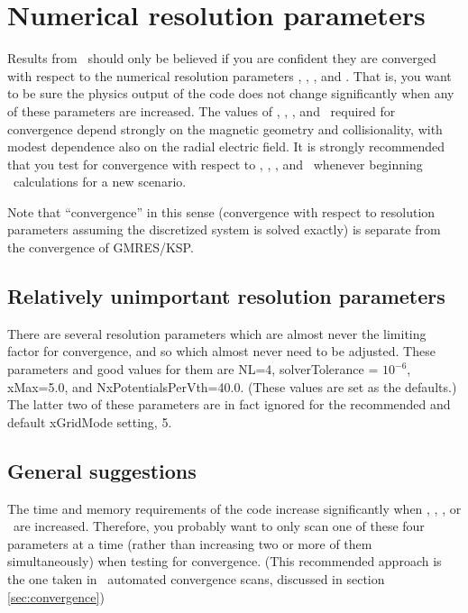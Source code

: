 \chapter{Numerical resolution parameters}
\label{ch:resolution}

Results from \sfincs~should only be believed if you are confident they
are converged with respect to the numerical resolution parameters
\Ntheta, \Nzeta, \Nxi, and \Nx.  That is, you want to be sure the
physics output of the code does not change significantly when any of
these parameters are increased. The values of \Ntheta, \Nzeta, \Nxi,
and \Nx~required for convergence depend strongly on the magnetic
geometry and collisionality, with modest dependence also on the radial
electric field. It is strongly recommended that you test for
convergence with respect to \Ntheta, \Nzeta, \Nxi, and \Nx~whenever
beginning \sfincs~calculations for a new scenario.

Note that ``convergence'' in this sense (convergence with respect to resolution parameters assuming the discretized
system is solved exactly) is separate from the convergence of GMRES/KSP.

\section{Relatively unimportant resolution parameters}

There are several resolution parameters which are almost never the limiting factor
for convergence, and so which almost never need to be adjusted.
These parameters and good values for them are {\ttfamily NL=4}, 
{\ttfamily solverTolerance} = $10^{-6}$,
{\ttfamily xMax=5.0},
and {\ttfamily NxPotentialsPerVth=40.0}.  
(These values are set as the defaults.)
The latter two of these parameters are in fact ignored
for the recommended and default {\ttfamily xGridMode} setting, 5.

\section{General suggestions}

The time and memory requirements of the code increase significantly
when \Ntheta, \Nzeta, \Nxi, or \Nx~are increased. Therefore, you
probably want to only scan one of these four parameters at a time
(rather than increasing two or more of them simultaneously) when
testing for convergence. (This recommended approach is the one taken
in \sfincsScan~automated convergence scans, discussed in section
\ref{sec:convergence})

